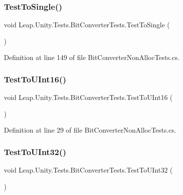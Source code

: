 \subsubsection{\texorpdfstring{TestToSingle()}{TestToSingle()}}
{\footnotesize\ttfamily void Leap.\+Unity.\+Tests.\+Bit\+Converter\+Tests.\+Test\+To\+Single (\begin{DoxyParamCaption}{ }\end{DoxyParamCaption})}



Definition at line 149 of file Bit\+Converter\+Non\+Alloc\+Tests.\+cs.

\mbox{\label{class_leap_1_1_unity_1_1_tests_1_1_bit_converter_tests_a199ab962faeb0c63a86d308e844f6b78}} 
\subsubsection{\texorpdfstring{TestToUInt16()}{TestToUInt16()}}
{\footnotesize\ttfamily void Leap.\+Unity.\+Tests.\+Bit\+Converter\+Tests.\+Test\+To\+U\+Int16 (\begin{DoxyParamCaption}{ }\end{DoxyParamCaption})}



Definition at line 29 of file Bit\+Converter\+Non\+Alloc\+Tests.\+cs.

\mbox{\label{class_leap_1_1_unity_1_1_tests_1_1_bit_converter_tests_a78fec5203b5dc47a33a5735782bec30b}} 
\subsubsection{\texorpdfstring{TestToUInt32()}{TestToUInt32()}}
{\footnotesize\ttfamily void Leap.\+Unity.\+Tests.\+Bit\+Converter\+Tests.\+Test\+To\+U\+Int32 (\begin{DoxyParamCaption}{ }\end{DoxyParamCaption})}



